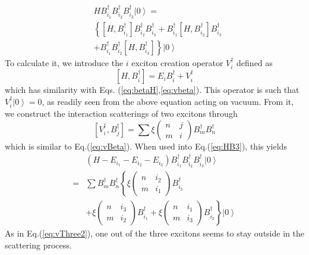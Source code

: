 \documentclass[epj]{svjour}
\begin{document}
\begin{equation}\label{eq:HB3}
\begin{split}
&HB^{\dagger}_{i_1}B^{\dagger}_{i_2}B^{\dagger}_{i_3}\left|0\right>=\\
&\left\{\left[H,B^{\dagger}_{i_1}\right] B^{\dagger}_{i _2}B^{\dagger}_{i_3}+B^{\dagger}_{i_1}%
\left[H,B^{\dagger}_{i_2}\right] B^{\dagger}_{i_3}\right.\\ 
&\left.+B^{\dagger}_{i_1}B^{\dagger}_{i_2}\left[H,B^{\dagger}_{i_3}\right]  \right\}\left|0\right> 
\end{split}
\end{equation} 
To calculate it, we introduce the $i$ exciton creation operator $V^\dagger_i$ defined as
\begin{equation}
\left[H,B^{\dagger}_{i}\right]=E_iB^\dagger_i+V^\dagger_i
\end{equation}
 which has similarity with Eqs. (\ref{eq:betaH},\ref{eq:vbeta}). This operator is such that $V^{\dagger}_{i}\left|0\right>=0$, as readily seen from the above equation acting on vacuum.  From it, we construct the interaction scatterings of two excitons through
 \begin{equation}  
\left[V^{\dagger}_{i},B^{\dagger}_{j}\right] 
=\sum\xi\left(\begin{smallmatrix}n&j\\m&i\end{smallmatrix}%
\right)  B^{\dagger}_{m}B^{\dagger}_{n}
\end{equation}
which is similar to Eq.(\ref{eq:vBeta}). When used into Eq.(\ref{eq:HB3}), this yields
\begin{equation}\label{eq:HEEE}
\begin{split}
&(H-E_{i_1}-E_{i_2}-E_{i_3})B^{\dagger}_{i_1}B^{\dagger}_{i_2}B^{\dagger}_{i_3}\left|0\right>\\
=&\sum{}B^\dagger_mB^\dagger_n\left\{
	\xi\left(\begin{smallmatrix}n&i_2\\m&i_1\end{smallmatrix}\right)B^{\dagger}_{i_3}\right.\\
	&\left.	+\xi\left(\begin{smallmatrix}n&i_3\\m&i_2\end{smallmatrix}\right)B^{\dagger}_{i_1}	+\xi\left(\begin{smallmatrix}n&i_1\\m&i_3\end{smallmatrix}\right)B^{\dagger}_{i_2}\right\}\left|0\right>
\end{split}
\end{equation}
As in Eq.(\ref{eq:vThree2}), one out of the three excitons seems to stay outside in the scattering process.
\end{document}
